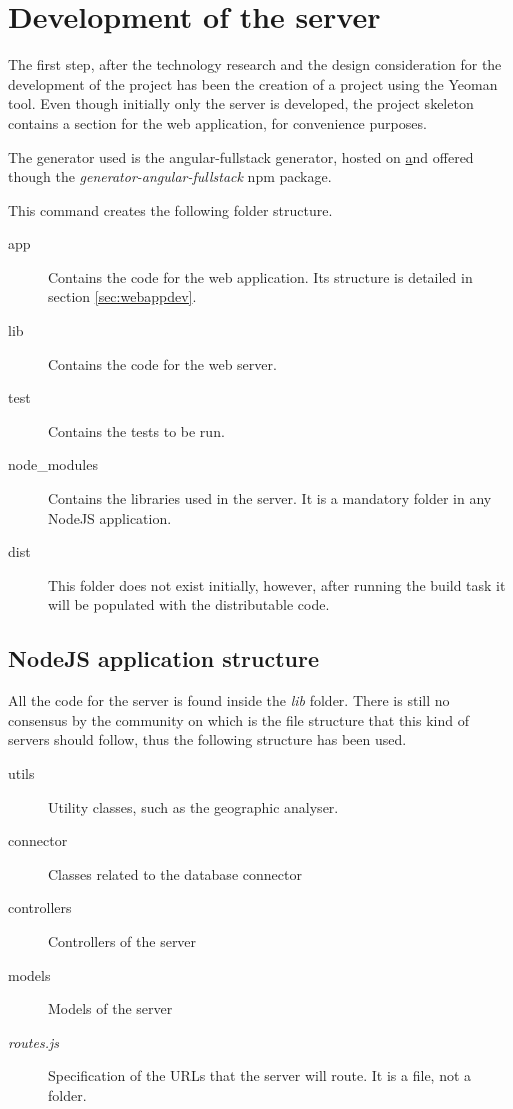 \section{Development of the server}\label{sec:serverdev}

The first step, after the technology research and the design consideration for the development of the project has been the creation of a project using the Yeoman tool. Even though initially only the server is developed, the project skeleton contains a section for the web application, for convenience purposes.

The generator used is the angular-fullstack generator, hosted on \href{https://github.com/DaftMonk/generator-angular-fullstack} and offered though the \textit{generator-angular-fullstack} npm package. 

This command creates the following folder structure.

\begin{description}
\item[app] Contains the code for the web application. Its structure is detailed in section \ref{sec:webappdev}.
\item[lib] Contains the code for the web server.
\item[test] Contains the tests to be run.
\item[node\_modules] Contains the libraries used in the server. It is a mandatory folder in any NodeJS application.
\item [dist] This folder does not exist initially, however, after running the build task it will be populated with the distributable code.
\end{description}

\subsection{NodeJS application structure}

All the code for the server is found inside the \textit{lib} folder. There is still no consensus by the community on which is the file structure that this kind of servers should follow, thus the following structure has been used.

\begin{description}
\item[utils] Utility classes, such as the geographic analyser.
\item[connector] Classes related to the database connector
\item[controllers] Controllers of the server
\item[models] Models of the server 
\item[\textit{routes.js}] Specification of the URLs that the server will route. It is a file, not a folder. 
\end{description}

